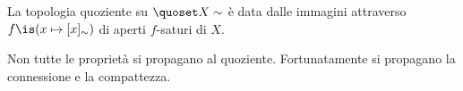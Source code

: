 \begin{prop}
	La topologia quoziente su $\quoset X\sim$ è data dalle immagini attraverso $f\is(x\mapsto[x]_\sim)$ di aperti $f$-saturi di $X$.
\end{prop}

\begin{oss} 
	Non tutte le proprietà si propagano al quoziente. Fortunatamente si propagano la connessione e la compattezza.
\end{oss}

%
%
%
%
%

